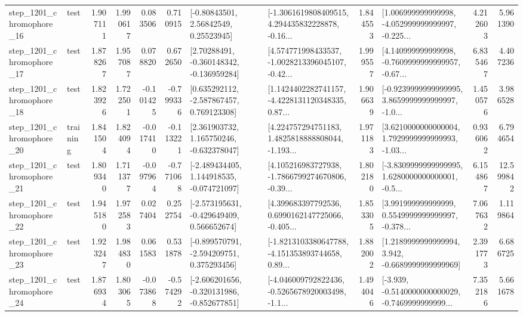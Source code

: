 \begin{tabular}{llrrrrllrlrr}
 step\_1201\_chromophore\_16 &      test &      1.907111 &    1.990617 &      0.083506 &  0.710915 &       [-0.80843501, 2.56842549, 0.25523945] &  [-1.3061619808409515, 4.294435832228878, -0.16... &       1.844553 &  [1.006999999999998, -4.052999999999997, -0.225... &            4.212603 &          5.961390 \\
 step\_1201\_chromophore\_17 &      test &      1.878267 &    1.957087 &      0.078820 &  0.672650 &    [2.70288491, -0.360148342, -0.136959284] &  [4.574771998433537, -1.0028213396045107, -0.42... &       1.999557 &  [4.140999999999998, -0.7609999999999957, -0.67... &            6.835467 &          4.407236 \\
 step\_1201\_chromophore\_18 &      test &      1.823926 &    1.722501 &     -0.101425 & -0.799336 &    [0.635292112, -2.587867457, 0.769123308] &  [1.1424402282741157, -4.4228131120348335, 0.87... &       1.906639 &  [-0.9239999999999995, 3.8659999999999997, -1.0... &            1.450576 &          3.986528 \\
 step\_1201\_chromophore\_20 &  training &      1.841504 &    1.824094 &     -0.017410 & -0.113221 &    [2.361903732, 1.165750246, -0.632378047] &  [4.224757294751183, 1.4825818888808044, -1.193... &       1.971183 &  [3.6210000000000004, 1.7929999999999993, -1.03... &            0.936062 &          6.794654 \\
 step\_1201\_chromophore\_21 &      test &      1.809340 &    1.711377 &     -0.097964 & -0.771068 &   [-2.489434405, 1.144918535, -0.074721097] &  [4.105216983727938, -1.7866799274670806, -0.39... &       1.802180 &  [-3.8309999999999995, 1.6280000000000001, -0.5... &            6.154867 &         12.599842 \\
 step\_1201\_chromophore\_22 &      test &      1.945180 &    1.972583 &      0.027404 &  0.252754 &   [-2.573195631, -0.429649409, 0.566652674] &  [4.399683397792536, 0.6990162147725066, -0.405... &       1.853305 &  [3.991999999999999, 0.5549999999999997, -0.378... &            7.067632 &          1.119864 \\
 step\_1201\_chromophore\_23 &      test &      1.923247 &    1.984830 &      0.061583 &  0.531878 &   [-0.899570791, -2.594209751, 0.375293456] &  [-1.8213103380647788, -4.151353893744658, 0.89... &       1.882002 &   [1.2189999999999994, 3.942, -0.6689999999999969] &            2.391773 &          6.686725 \\
 step\_1201\_chromophore\_24 &      test &      1.876934 &    1.803065 &     -0.073868 & -0.574292 &  [-2.606201656, -0.320131986, -0.852677851] &  [-4.046009792822436, -0.5265678920003498, -1.1... &       1.494046 &  [-3.939, -0.5140000000000029, -0.7469999999999... &            7.352186 &          5.661678 \\

\end{tabular}
